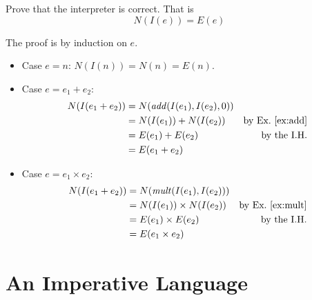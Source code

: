 \documentclass{tufte-handout}
\newcommand{\BR}[1]{(#1)}
\newcommand{\TRUE}[0]{\mathtt{true}}
\newcommand{\FALSE}[0]{\mathtt{false}}
\newcommand{\COND}[3]{#1\,\texttt{?}\,#2\,\texttt{:}\,#3}
\begin{document}
\begin{Exercise}
\label{binary-interp-correct}
 Prove that the interpreter is correct.
 That is
 \[
 N(I\BR{ e }) = E\BR{ e }
 \]
\end{Exercise}
\begin{Answer}
The proof is by induction on $e$.
\begin{itemize}
\item Case $e=n$: 
  $N(I\BR{ n }) = N\BR{ n } = E\BR{ n }$. 
\item Case $e = e_1 + e_2$: 
  \begin{align*}
    N(I\BR{e_1 + e_2}) &= N(\mathit{add}(I\BR{e_1}, I\BR{e_2}, 0)) \\
     & = N(I\BR{e_1}) + N(I\BR{e_2}) & \text{by Ex.~\ref{ex:add}}\\
     & = E\BR{e_1} + E\BR{e_2} & \text{by the I.H.}\\
     & = E\BR{e_1 + e_2}
  \end{align*}

\item Case $e = e_1 \times e_2$: 
  \begin{align*}
    N(I\BR{e_1 + e_2}) &= N(\mathit{mult}(I\BR{e_1}, I\BR{e_2})) \\
     & = N(I\BR{e_1}) \times N(I\BR{e_2}) & \text{by Ex.~\ref{ex:mult}}\\
     & = E\BR{e_1} \times E\BR{e_2} & \text{by the I.H.}\\
     & = E\BR{e_1 \times e_2}
  \end{align*}

\end{itemize}
\end{Answer}





\section{An Imperative Language}

\end{document}

